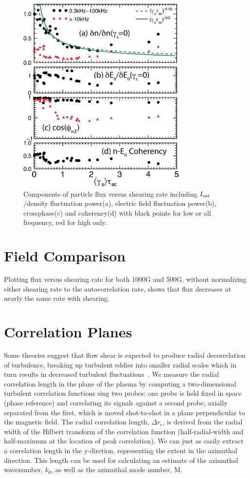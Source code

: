 \documentclass[aip,pop,amsmath,amssymb,preprint,superscriptaddress]{revtex4-1} %
\begin{document}
\begin{figure}[!htbp]
\centerline{
\includegraphics[width=8.5cm]{figure5.eps}}
\caption{\label{fig:fluxcomps} Components of particle flux versus shearing rate including $I_{\rm sat}$/density fluctuation power(a), electric field fluctuation power(b), crossphase(c) and coherency(d) with black points for low or all frequency, red for high only.}
\end{figure}

\section{Field Comparison}

Plotting flux versus shearing rate for both 1000G and 500G, without normalizing either shearing rate to the autocorrelation rate, shows that flux decreases at nearly the same rate with shearing.

\section{Correlation Planes}

Some theories suggest that flow shear is expected to produce radial decorrelation of turbulence,
breaking up turbulent eddies into smaller radial scales which in turn results in decreased turbulent fluctuations~\cite{biglari90}.
We measure the radial correlation length in the plane of the plasma by computing a two-dimensional turbulent correlation functions sing
two probes: one probe is held fixed in space (phase reference) and
correlating its signals against a second probe, axially separated
from the first, which is moved shot-to-shot in a plane perpendicular
to the magnetic field.  The radial correlation length, $\Delta r_c$,
is derived from the radial width of the Hilbert transform of the
correlation function (half-radial-width and half-maximum at the
location of peak correlation). We can just as easily extract a correlation length in the y-diretion, representing the extent in the azimuthal direction. This length can be used for calculating an estimate of the azimuthal wavenumber, $k_{\theta}$, as well as the azimuthal mode number, M.
\end{document}
